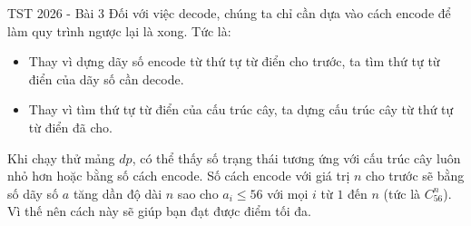 \begin{tutorial}{TST 2026 - Bài 3}
Đối với việc decode, chúng ta chỉ cần dựa vào cách encode để làm quy trình ngược lại là xong. Tức là:
\begin{itemize}
   \item Thay vì dựng dãy số encode từ thứ tự từ điển cho trước, ta tìm thứ tự từ điển của dãy số cần decode.
   \item Thay vì tìm thứ tự từ điển của cấu trúc cây, ta dựng cấu trúc cây từ thứ tự từ điển đã cho.
\end{itemize}

Khi chạy thử mảng $dp$, có thể thấy số trạng thái tương ứng với cấu trúc cây luôn nhỏ hơn hoặc bằng số cách encode. Số cách encode với giá trị $n$ cho trước sẽ bằng số dãy số $a$ tăng dần độ dài $n$ sao cho $a_i\le 56$ với mọi $i$ từ $1$ đến $n$ (tức là $C_{56}^n$). Vì thế nên cách này sẽ giúp bạn đạt được điểm tối đa.

\end{tutorial}

